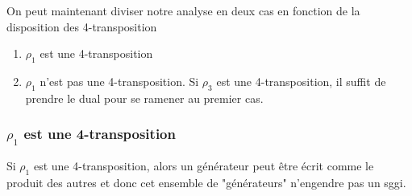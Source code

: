On peut maintenant diviser notre analyse en deux cas en fonction de la disposition des 4-transposition

\begin{enumerate}
  \item $\rho_1$ est une 4-transposition
  \item $\rho_1$ n'est pas une 4-transposition. Si $\rho_3$ est une 4-transposition, il suffit de prendre le dual pour se ramener au premier cas.
\end{enumerate}

\subsubsection{$\rho_1$ est une 4-transposition}

\begin{theorem}
  Si $\rho_1$ est une 4-transposition, alors un générateur peut être écrit comme le produit des autres et donc cet ensemble de "générateurs" n'engendre pas un sggi.
\end{theorem}

